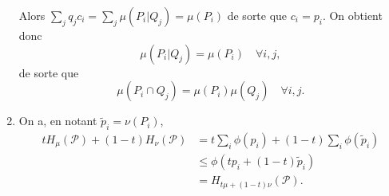 \documentclass[a4paper,12pt,openany]{article}
\theoremstyle{plain}
\theoremstyle{definition}
\newcommand{\Pcal}{\mathcal{P}}
\begin{document}
\begin{enumerate}
Alors $\sum_j q_j c_i = \sum_j \mu(P_i|Q_j) = \mu(P_i)$ de sorte que $c_i = p_i.$  On obtient donc
$$
\mu(P_i|Q_j) = \mu(P_i) \quad \forall i,j,
$$
 de sorte que
$$
\mu(P_i \cap Q_j) = \mu(P_i) \mu(Q_j) \quad \forall i,j.
$$



\item On a, en notant $\tilde p_i = \nu(P_i)$,
$$
\begin{aligned}
tH_\mu(\Pcal) + (1-t) H_\nu(\Pcal) &= t \sum_i \phi(p_i) + (1-t) \sum_i \phi(\tilde p_i)  \\
&\leqslant \phi\left(tp_i + (1-t)\tilde p_i\right)  \\
&= H_{t\mu + (1-t)\nu}(\Pcal).
\end{aligned}
$$\end{enumerate}
\vspace{0.6cm}

 \vspace{1.5mm} 
\end{document}
